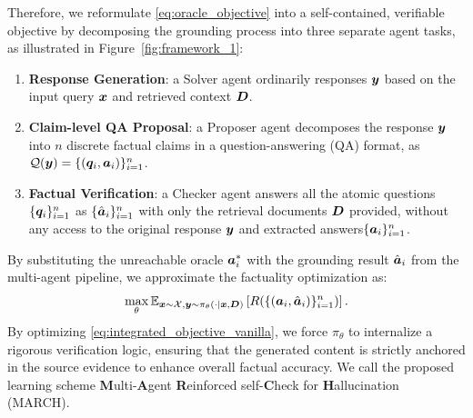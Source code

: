 \documentclass[10pt, a4paper, logo]{googledeepmind} %
\newcommand{\pengyu}[1]{{\color{blue}{[\bf\sf Pengyu: #1]}}}
\begin{document}
Therefore, we reformulate \eqref{eq:oracle_objective} into a self-contained, verifiable objective by decomposing the grounding process into three separate agent tasks, as illustrated in Figure~\ref{fig:framework_1}: 
\begin{enumerate}[leftmargin=2.5ex]
\vspace{-1mm}
    \item \textbf{Response Generation}: a Solver agent ordinarily responses ${\bm{y}}$ based on the input query ${\bm{x}}$ and retrieved context ${\bm{D}}$. 
    \item  \textbf{Claim-level QA Proposal}: a Proposer agent decomposes the response ${\bm{y}}$ into $n$ discrete factual claims in a question-answering (QA) format, as ${\mathcal{Q}}({\bm{y}}) = \{({\bm{q}}_i, {\bm{a}}_i)\}_{i=1}^n$.
    \item \textbf{Factual Verification}: a Checker agent answers all the atomic questions $\{{\bm{q}}_i\}_{i=1}^n$ as $\{\hat{{\bm{a}}}_i\}_{i=1}^n$ with only the retrieval documents ${\bm{D}}$ provided, without any access to the original response ${\bm{y}}$ and extracted answers$\{{\bm{a}}_i\}_{i=1}^n$. %
\end{enumerate}
By substituting the unreachable oracle ${\bm{a}}^*_i$ with the  grounding result $\hat{{\bm{a}}}_i$ from the multi-agent pipeline, we approximate the factuality optimization as: %
\begin{equation}\label{eq:integrated_objective_vanilla}
   \max_{\theta} \mathbb{E}_{{\bm{x}}\sim {\mathcal{X}}, {\bm{y}} \sim \pi_{\theta}(\cdot | {\bm{x}}, {\bm{D}})} \left[ R(\{({\bm{a}}_i, \hat{{\bm{a}}}_i)\}_{i=1}^n) \right].
\end{equation}
By optimizing \eqref{eq:integrated_objective_vanilla}, we force $\pi_\theta$ to internalize a rigorous verification logic, ensuring that the generated content is strictly anchored in the source evidence to enhance overall factual accuracy. We call the proposed learning scheme \textbf{M}ulti-\textbf{A}gent \textbf{R}einforced self-\textbf{C}heck for \textbf{H}allucination (MARCH).
\end{document}
